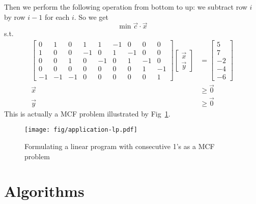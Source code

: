 \documentclass[UTF8,a4paper]{ctexart}
\begin{document}
Then we perform the following operation from bottom to up:
we subtract row $i$ by row $i-1$ for each $i$.
So we get
\[
    \min \vec{c}\cdot\vec{x}
\]
s.t.
\begin{align*}
    \begin{bmatrix}
        0&1&0&1&1& -1&0&0&0\\
        1&0&0&-1&0& 1&-1&0&0\\
        0&0&1&0&-1& 0&1&-1&0\\
        0&0&0&0&0& 0&0&1&-1\\
        -1&-1&-1&0&0& 0&0&0&1
    \end{bmatrix}
    \begin{bmatrix}
        \vec{x}\\
        \vec{y}
    \end{bmatrix}
    &=\begin{bmatrix}
        5\\
        7\\
        -2\\
        -4\\
        -6
    \end{bmatrix}
    \\ \vec{x}&\geq \vec{0}
    \\ \vec{y}&\geq \vec{0}
\end{align*}
This is actually a MCF problem illustrated by Fig~\ref{fig:app:lp}.

\begin{figure}
    \begin{center}
        \texttt{[image: fig/application-lp.pdf]}
    \end{center}
    \caption{Formulating a linear program with consecutive 1's as a MCF problem}
    \label{fig:app:lp}
\end{figure}

\section{Algorithms}
\end{document}
